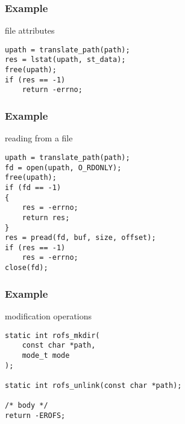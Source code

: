 \documentclass[dvipsnames]{beamer}
\begin{document}
\begin{frame}[fragile]
  \frametitle{Example}

  \begin{exampleblock}{file attributes}
    \begin{lstlisting}
upath = translate_path(path);
res = lstat(upath, st_data);
free(upath);
if (res == -1)
    return -errno;
    \end{lstlisting}
  \end{exampleblock}
\end{frame}

\begin{frame}[fragile]
  \frametitle{Example}

  \begin{exampleblock}{reading from a file}
    \begin{lstlisting}
upath = translate_path(path);
fd = open(upath, O_RDONLY);
free(upath);
if (fd == -1)
{
    res = -errno;
    return res;
}
res = pread(fd, buf, size, offset);
if (res == -1)
    res = -errno;
close(fd);
    \end{lstlisting}
  \end{exampleblock}
\end{frame}

\begin{frame}[fragile]
  \frametitle{Example}

  \begin{exampleblock}{modification operations}
    \begin{lstlisting}
static int rofs_mkdir(
    const char *path,
    mode_t mode
);

static int rofs_unlink(const char *path);

/* body */
return -EROFS;
    \end{lstlisting}
  \end{exampleblock}
\end{frame}
\end{document}
